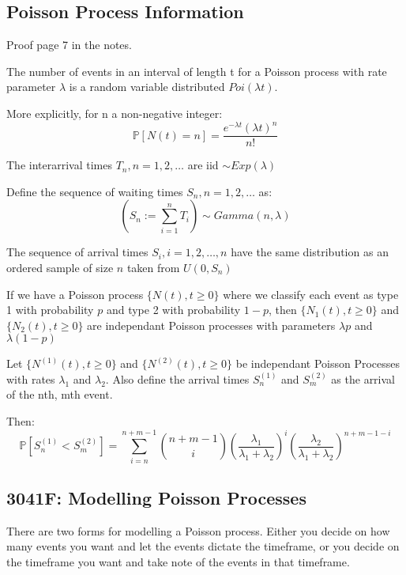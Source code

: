 \subsection{Poisson Process Information}
Proof page 7 in the notes.

The number of events in an interval of length t for a Poisson process with 
rate parameter \(\lambda\) is a random variable distributed \(Poi(\lambda t)\).

More explicitly, for n a non-negative integer:
\begin{equation*}
    \mathbb{P}[N(t) = n] = \frac{e^{-\lambda t}(\lambda t)^n}{n!}
\end{equation*}

The interarrival times \({T_n, n=1, 2, \dots}\) are iid \(\sim Exp(\lambda)\)

Define the sequence of waiting times \({S_n, n=1, 2, \dots}\) as: 
\begin{equation*}
    \left(S_n := \sum_{i=1}^n T_i\right) \sim Gamma(n, \lambda)
\end{equation*}


The sequence of arrival times \({S_i, i=1, 2, \dots, n}\) have the same distribution as an ordered sample of size \(n\) taken from \(U(0, S_n)\)


If we have a Poisson process \(\{N(t), t \ge 0\}\) where we classify each event as type 1
with probability \(p\) and type 2 with probability \(1-p\), then 
\(\{N_1(t), t \ge 0\}\) and \(\{N_2(t), t \ge 0\}\) are independant Poisson 
processes with parameters \(\lambda p\) and \(\lambda (1-p)\)


Let \(\{N^{(1)}(t), t \ge 0\}\) and \(\{N^{(2)}(t), t \ge 0\}\) be independant Poisson 
Processes with rates \(\lambda_1\) and \(\lambda_2\).
Also define the arrival times \(S^{(1)}_n\) and \(S^{(2)}_m\) as the arrival of the nth, mth event.

Then:
\begin{equation*}
    \mathbb{P}[S^{(1)}_n < S^{(2)}_m] = 
    \sum_{i=n}^{n + m - 1} 
    \binom{n + m - 1}{i} 
    \left( \frac{\lambda_1}{\lambda_1 + \lambda_2} \right)^i 
    \left( \frac{\lambda_2}{\lambda_1 + \lambda_2} \right)^{n + m - 1 - i}
\end{equation*}
\subsection{3041F: Modelling Poisson Processes}
There are two forms for modelling a Poisson process. 
Either you decide on how many events you want and let the events dictate the timeframe,
or you decide on the timeframe you want and take note of the events in that timeframe.

